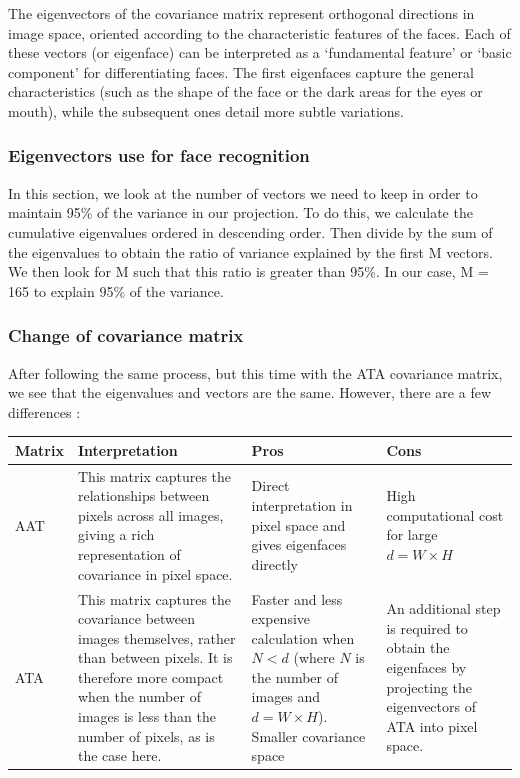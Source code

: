 The eigenvectors of the covariance matrix represent orthogonal directions in image space, oriented according to the characteristic features of the faces. Each of these vectors (or eigenface) can be interpreted as a ‘fundamental feature’ or ‘basic component’ for differentiating faces. The first eigenfaces capture the general characteristics (such as the shape of the face or the dark areas for the eyes or mouth), while the subsequent ones detail more subtle variations.

\subsubsection{Eigenvectors use for face recognition}

In this section, we look at the number of vectors we need to keep in order to maintain 95\% of the variance in our projection. To do this, we calculate the cumulative eigenvalues ordered in descending order. Then divide by the sum of the eigenvalues to obtain the ratio of variance explained by the first M vectors. We then look for M such that this ratio is greater than 95\%. In our case, M = 165 to explain 95\% of the variance.

\subsubsection{Change of covariance matrix}

After following the same process, but this time with the ATA covariance matrix, we see that the eigenvalues and vectors are the same. However, there are a few differences :


\begin{longtable}{|l|p{7cm}|p{3cm}|p{3cm}|}
	\hline
	\textbf{Matrix} & \textbf{Interpretation} & \textbf{Pros} & \textbf{Cons} \\
	\hline
	\endfirsthead
	
	\hline
	\endfoot
	
	\hline
	\endlastfoot
	
	AAT & This matrix captures the relationships between pixels across all images, giving a rich representation of covariance in pixel space. & Direct interpretation in pixel space and gives eigenfaces directly & High computational cost for large \( d = W \times H \) \\
	\hline
	ATA & This matrix captures the covariance between images themselves, rather than between pixels. It is therefore more compact when the number of images is less than the number of pixels, as is the case here. & Faster and less expensive calculation when \( N < d \) (where \( N \) is the number of images and \( d = W \times H \)). Smaller covariance space & An additional step is required to obtain the eigenfaces by projecting the eigenvectors of ATA into pixel space. \\
\end{longtable}

